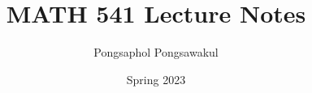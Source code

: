 \documentclass[11pt,titlepage=false]{scrreprt}
\begin{document}
\setlength{\textheight}{8.5in}
\setlength{\parskip}{2ex plus 0.5ex minus 0.2ex}
\setlength{\parindent}{0pt}


\title{MATH 541 Lecture Notes}
\author{Pongsaphol Pongsawakul}
\date{Spring 2023}
\maketitle
\tableofcontents


% 
% 






% 
% 

% 
% 
\end{document}
